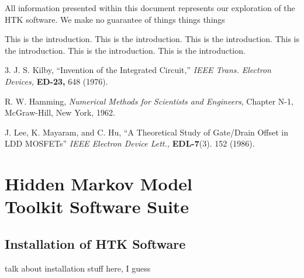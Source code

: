 \documentclass{wileySev}
\begin{document}

\subtitle{Probabilistic Accent Detection Using Hidden Markov Models}


\titlepage
\tableofcontents


\begin{preface}
All information presented within this document represents our exploration of the HTK software. We make no guarantee of things things things

\end{preface}

\begin{introduction}
This is the introduction.
This is the introduction.
This is the introduction.
This is the introduction.
This is the introduction.
This is the introduction.


\begin{chapreferences}{3.}
J. S. Kilby,
``Invention of the Integrated Circuit,'' {\it IEEE Trans. Electron Devices,}
{\bf ED-23,} 648 (1976).

R. W. Hamming,
                 {\it Numerical Methods for Scientists and 
                 Engineers}, Chapter N-1, McGraw-Hill, 
                 New York, 1962.

J. Lee, K. Mayaram, and C. Hu, ``A Theoretical
               Study of Gate/Drain Offset in LDD MOSFETs''
                     {\it IEEE Electron Device Lett.,} {\bf EDL-7}(3). 152 
                     (1986).
\end{chapreferences}
\end{introduction}


\part[HTK Software Suite]
{Hidden Markov Model\\Toolkit Software Suite}

\chapter{Installation of HTK Software}
talk about installation stuff here, I guess
\end{document}
